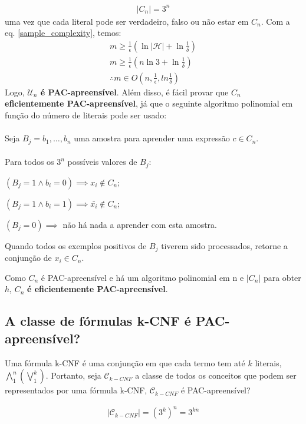 \documentclass[
10pt, %
a4paper, %
onecolumn, %
]{article}
\begin{document}
\begin{align}
    |C_n| = 3^n 
\end{align}
uma vez que cada literal pode ser verdadeiro, falso ou não estar em $C_n$.
Com a eq. \ref{sample_complexity}, temos:
\begin{align}
    m \geq \frac{1}{\epsilon}(\ln{|\mathcal{H}|} + \ln{\frac{1}{\delta}})\\
    m \geq \frac{1}{\epsilon}(n\ln{3} + \ln{\frac{1}{\delta}}) \\
    \therefore m \in O(n, \frac{1}{\epsilon}, ln{\frac{1}{\delta}})
\end{align}
Logo, \textbf{$\mathcal{U}_n$ é PAC-apreensível}. Além disso, é fácil provar que $C_n$ \textbf{eficientemente PAC-apreensível}, já que o seguinte algoritmo polinomial em função do número de literais pode ser usado: \\ \\
Seja $ B_j = {b_1, \ldots, b_n}$ uma amostra para aprender uma expressão $c \in C_n$. \\ \\
Para todos os $3^n$ possíveis valores de $B_j$:
\begin{description}
    \item  $(B_j=1 \land b_i=0) \implies x_i \notin C_n$;
    \item  $(B_j=1 \land b_i=1) \implies \bar{x_i} \notin C_n$;
    \item  $(B_j=0) \implies $ não há nada a aprender com esta amostra.
    \item  Quando todos os exemplos positivos de $B_j$ tiverem sido processados, retorne a conjunção de $x_i \in C_n$. 
\end{description}
Como $C_n$ é PAC-apreensível e há um algoritmo polinomial em n e  $|C_n|$ para obter $h$, $C_n$ \textbf{é eficientemente PAC-apreensível}.


\subsection{A classe de fórmulas k-CNF é PAC-apreensível?}
Uma fórmula k-CNF é uma conjunção em que cada termo tem até $k$ literais, $\bigwedge_{1}^{n}(\bigvee_{1}^{k})$. Portanto, seja $\mathcal{C}_{k-CNF}$ a classe de todos os conceitos que podem ser representados por uma fórmula k-CNF, $\mathcal{C}_{k-CNF}$ é PAC-apreensível?

\begin{align}
    |\mathcal{C}_{k-CNF}| = (3^k)^n = 3 ^{k \dot n} \label{kcnf}
\end{align}
\end{document}

